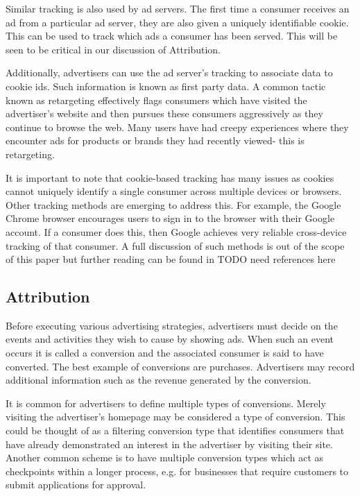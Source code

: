 \documentclass{article}
\begin{document}
Similar tracking is also used by ad servers. The first time a consumer receives an ad from a particular ad server, they are also given a uniquely identifiable cookie. This can be used to track which ads a consumer has been served. This will be seen to be critical in our discussion of Attribution.

Additionally, advertisers can use the ad server's tracking to associate data to cookie ids. Such information is known as first party data. A common tactic known as retargeting effectively flags consumers which have visited the advertiser's website and then pursues these consumers aggressively as they continue to browse the web. Many users have had creepy experiences where they encounter ads for products or brands they had recently viewed- this is retargeting.

It is important to note that cookie-based tracking has many issues as cookies cannot uniquely identify a single consumer across multiple devices or browsers. Other tracking methods are emerging to address this. For example, the Google Chrome browser encourages users to sign in to the browser with their Google account. If a consumer does this, then Google achieves very reliable cross-device tracking of that consumer. A full discussion of such methods is out of the scope of this paper but further reading can be found in TODO need references here

\subsection{Attribution}

Before executing various advertising strategies, advertisers must decide on the events and activities they wish to cause by showing ads. When such an event occurs it is called a conversion and the associated consumer is said to have converted. The best example of conversions are purchases. Advertisers may record additional information such as the revenue generated by the conversion.

It is common for advertisers to define multiple types of conversions. Merely visiting the advertiser's homepage may be considered a type of conversion. This could be thought of as a filtering conversion type that identifies consumers that have already demonstrated an interest in the advertiser by visiting their site. Another common scheme is to have multiple conversion types which act as checkpoints within a longer process, e.g. for businesses that require customers to submit applications for approval.
\end{document}
